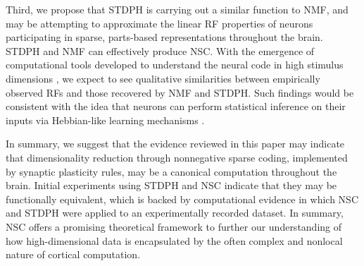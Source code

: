 Third, we propose that \ac{STDPH} is carrying out a similar function to \ac{NMF},
and may be attempting to approximate the linear \ac{RF} properties of
neurons participating in sparse, parts-based representations
throughout the brain. STDPH and NMF can effectively produce NSC.
With the emergence of computational tools developed
to understand the neural code 
in high stimulus dimensions \citep{PillowSimoncelli2006},
we expect to see qualitative similarities between empirically observed
\acp{RF} and those recovered by \ac{NMF} and \ac{STDPH}.
Such findings would be consistent with the idea that neurons
can perform statistical inference on their inputs via
Hebbian-like learning mechanisms
\citep{Nessler2009,Carlson2013,MorenoBoteDrugowitsch2015,Oja1982}.



In summary, we suggest that the evidence reviewed in this paper may indicate that dimensionality reduction through nonnegative sparse coding, implemented by synaptic plasticity rules, may be a canonical computation throughout the brain. Initial experiments using STDPH and \ac{NSC} indicate that they may be functionally equivalent, which is backed by computational evidence in which \ac{NSC} and \ac{STDPH} were applied to an experimentally recorded dataset.
In summary, \ac{NSC} offers a promising theoretical framework to further our understanding of how high-dimensional data is encapsulated by the often complex and nonlocal nature of cortical computation.



